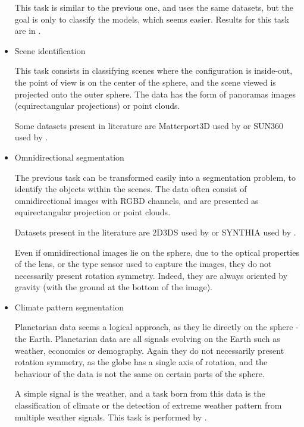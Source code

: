 \documentclass[11pt]{report}
\begin{document}
\begin{itemize}
    This task is similar to the previous one, and uses the same datasets, but the goal is only to classify the models, which seems easier. Results for this task are in \cite{esteves_learning_2017, esteves_equivariant_2019, jiang_spherical_2019}.
    \item Scene identification
    
    This task consists in classifying scenes where the configuration is inside-out, the point of view is on the center of the sphere, and the scene viewed is projected onto the outer sphere. The data has the form of panoramas images (equirectangular projections) or point clouds.
    
    Some datasets present in literature are Matterport3D \cite{noauthor_matterport3d:_nodate} used by \cite{esteves_equivariant_2019} or SUN360 used by \cite{lee_spherephd:_2018}.
    
    \item Omnidirectional segmentation
    
    The previous task can be transformed easily into a segmentation problem, to identify the objects within the scenes. The data often consist of omnidirectional images with RGBD channels, and are presented as equirectangular projection or point clouds.
    
    Datasets present in the literature are 2D3DS \cite{armeni_joint_nodate} used by \cite{jiang_spherical_2019, cohen_gauge_2019} or SYNTHIA used by \cite{lee_spherephd:_2018}.
    
    Even if omnidirectional images lie on the sphere, due to the optical properties of the lens, or the type sensor used to capture the images, they do not necessarily present rotation symmetry. Indeed, they are always oriented by gravity (with the ground at the bottom of the image).
    
    \item Climate pattern segmentation
    
    Planetarian data seems a logical approach, as they lie directly on the sphere - the Earth. Planetarian data are all signals evolving on the Earth such as weather, economics or demography.
    Again they do not necessarily present rotation symmetry, as the globe has a single axis of rotation, and the behaviour of the data is not the same on certain parts of the sphere.
    
    A simple signal is the weather, and a task born from this data is the classification of climate or the detection of extreme weather pattern from multiple weather signals. This task is performed by \cite{jiang_spherical_2019, cohen_gauge_2019}.
    
    
    
\end{itemize}
\end{document}
